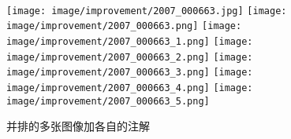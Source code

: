 \begin{figure}[h]
\centering
	\enspace
	\enspace
	\enspace\thinspace
	\enspace\thinspace
	\enspace\thinspace
	\enspace\thinspace
	\\
	\texttt{[image: image/improvement/2007\_000663.jpg]}
	\enspace\thinspace %
	\texttt{[image: image/improvement/2007\_000663.png]}
	\enspace\thinspace
	\texttt{[image: image/improvement/2007\_000663\_1.png]}
	\enspace\thinspace
	\texttt{[image: image/improvement/2007\_000663\_2.png]}
	\enspace\thinspace
	\texttt{[image: image/improvement/2007\_000663\_3.png]}
	\enspace\thinspace
	\texttt{[image: image/improvement/2007\_000663\_4.png]}
	\enspace\thinspace
	\texttt{[image: image/improvement/2007\_000663\_5.png]}
	\enspace\thinspace
	\caption{并排的多张图像加各自的注解}
	\label{fig:improvement}
\end{figure}
